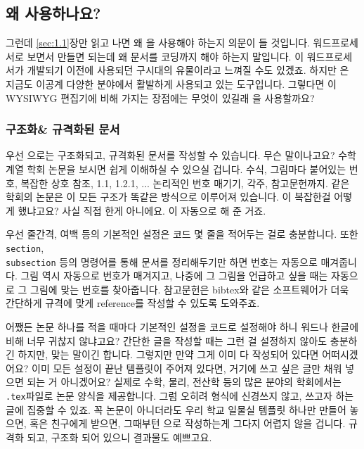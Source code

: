 \subsection{왜  사용하나요?}
\label{sec:1.2}
그런데 \ref{sec:1.1}장만 읽고 나면 왜 \lt 을 사용해야 하는지 의문이 들 것입니다.
워드프로세서로 보면서 만들면 되는데 왜 문서를 코딩까지 해야 하는지 말입니다.
\lt 이 워드프로세서가 개발되기 이전에 사용되던 구시대의 유물이라고 느껴질 수도 있겠죠.
하지만 \lt 은 지금도 이공계 다양한 분야에서 활발하게 사용되고 있는 도구입니다.
그렇다면 \lt 이  WYSIWYG 편집기에 비해 가지는 장점에는 무엇이 있길래 \lt 을 사용할까요?

\subsubsection{구조화\& 규격화된 문서}
\label{sec:1.2-org}

우선 \lt 으로는 구조화되고, 규격화된 문서를 작성할 수 있습니다.
무슨 말이나고요?
수학 계열 학회 논문을 보시면 쉽게 이해하실 수 있으실 겁니다.
수식, 그림마다 붙어있는 번호, 복잡한 상호 참조, 1.1, 1.2.1, ... 논리적인 번호 매기기, 각주, 참고문헌까지.
같은 학회의 논문은 이 모든 구조가 똑같은 방식으로 이루어져 있습니다.
이 복잡한걸 어떻게 했냐고요?
사실 직접 한게 아니에요.
\lt 이 자동으로 해 준 거죠.

우선 줄간격, 여백 등의 기본적인 설정은 코드 몇 줄을 적어두는 걸로 충분합니다.
또한 \verb|section|, \\ \verb|subsection| 등의 명령어를 통해 문서를 정리해두기만 하면 번호는  자동으로 매겨줍니다.
그림 역시 자동으로 번호가 매겨지고, 나중에 그 그림을 언급하고 싶을 때는 자동으로 그 그림에 맞는 번호를 찾아줍니다.
참고문헌은 bibtex와 같은 소프트웨어가 더욱 간단하게 규격에 맞게 reference를 작성할 수 있도록 도와주죠.

어쨌든 논문 하나를 적을 때마다 기본적인 설정을 코드로 설정해야 하니 워드나 한글에 비해 너무 귀찮지 않냐고요?
간단한 글을 작성할 때는 그런 걸 설정하지 않아도 충분하긴 하지만, 맞는 말이긴 합니다.
그렇지만 만약 그게 이미 다 작성되어 있다면 어떠시겠어요?
이미 모든 설정이 끝난 템플릿이 주어져 있다면, 거기에 쓰고 싶은 글만 채워 넣으면 되는 거 아니겠어요?
실제로 수학, 물리, 전산학 등의 많은 분야의 학회에서는  \verb|.tex|파일로 논문 양식을 제공합니다.
그럼 오히려 형식에 신경쓰지 않고, 쓰고자 하는 글에 집중할 수 있죠.
꼭 논문이 아니더라도 우리 학교 일물실 템플릿 하나만 만들어 놓으면, 혹은 친구에게 받으면, 그때부턴 \lt 으로 작성하는게 그다지 어렵지 않을 겁니다. 규격화 되고, 구조화 되어 있으니 결과물도 예쁘고요.

